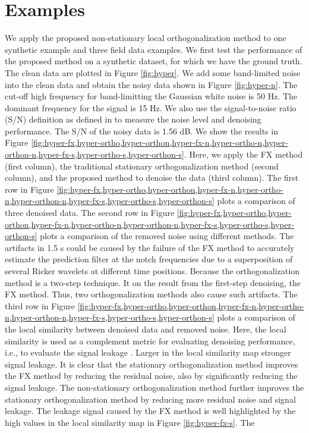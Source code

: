 \section{Examples}
We apply the proposed non-stationary local orthogonalization method to one synthetic example and three field data examples.  We first test the performance of the proposed method on a synthetic dataset, for which we have the ground truth. The clean data are plotted in Figure \ref{fig:hyper}. We add some band-limited noise into the clean data and obtain the noisy data shown in Figure \ref{fig:hyper-n}. The cut-off high frequency for band-limitting the Gaussian white noise is 50 Hz. The dominant frequency for the signal is 15 Hz. We also use the signal-to-noise ratio (S/N) definition as defined in \cite{yangkang2015ortho} to measure the noise level and denoising performance. The S/N of the noisy data is 1.56 dB. We show the results in Figure \ref{fig:hyper-fx,hyper-ortho,hyper-orthon,hyper-fx-n,hyper-ortho-n,hyper-orthon-n,hyper-fx-s,hyper-ortho-s,hyper-orthon-s}. Here, we apply the FX method (first column), the traditional stationary orthogonalization method (second column), and the proposed method to denoise the data (third column).  The first row in Figure \ref{fig:hyper-fx,hyper-ortho,hyper-orthon,hyper-fx-n,hyper-ortho-n,hyper-orthon-n,hyper-fx-s,hyper-ortho-s,hyper-orthon-s} plots a comparison of three denoised data. The second row in Figure \ref{fig:hyper-fx,hyper-ortho,hyper-orthon,hyper-fx-n,hyper-ortho-n,hyper-orthon-n,hyper-fx-s,hyper-ortho-s,hyper-orthon-s} plots a comparison of the removed noise using different methods. The artifacts in 1.5 s could be caused by the failure of the FX method to accurately estimate the prediction filter at the notch frequencies due to a superposition of several Ricker wavelets at different time positions. Because the orthogonalization method is a two-step technique. It  on the result from the first-step denoising,  the FX method. Thus, two orthogonalization methods also cause  such artifacts. The third row in Figure \ref{fig:hyper-fx,hyper-ortho,hyper-orthon,hyper-fx-n,hyper-ortho-n,hyper-orthon-n,hyper-fx-s,hyper-ortho-s,hyper-orthon-s} plots a comparison of the local similarity between denoised data and removed noise. Here, the local similarity is used as a complement metric for evaluating denoising performance, i.e., to evaluate the signal leakage \cite[]{yangkang2015ortho}. Larger  in the local similarity map  stronger signal leakage. It is clear that the stationary orthogonalization method improves the FX method by reducing the residual noise, also by significantly reducing the signal leakage. The non-stationary orthogonalization method further improves the stationary orthogonalization method by reducing more residual noise and signal leakage.  The leakage signal caused by the FX method is well highlighted by the high values in the local similarity map in Figure \ref{fig:hyper-fx-s}. The 
